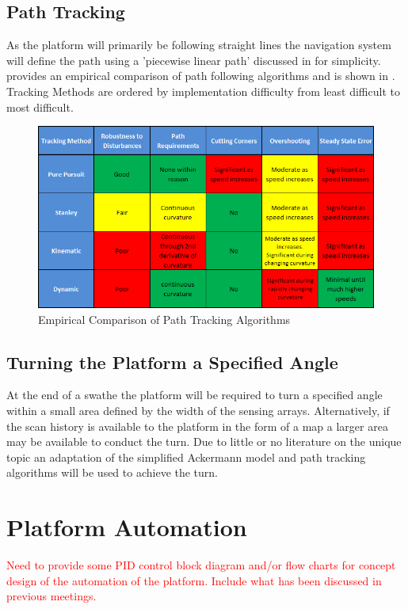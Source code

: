 \documentclass[main.tex]{subfiles}
\begin{document}
\subsection{Path Tracking}
As the platform will primarily be following straight lines the navigation system will define the path using a 'piecewise linear path' discussed in  for simplicity.
\Textcite{snider2009} provides an empirical comparison of path following algorithms and is shown in . Tracking Methods are ordered by implementation difficulty from least difficult to most difficult.
\begin{figure}[ht]
\includegraphics[width = \textwidth]{4-ConceptDesign/pathTrackingSummary2.png}
\centering
\caption[Empirical Comparison of Path Tracking Algorithms]{Empirical Comparison of Path Tracking Algorithms \parencite{snider2009}} 
\end{figure}

\subsection{Turning the Platform a Specified Angle}
At the end of a swathe the platform will be required to turn a specified angle within a small area defined by the width of the sensing arrays. Alternatively, if the scan history is available to the platform in the form of a map a larger area may be available to conduct the turn. Due to little or no literature on the unique topic an adaptation of the simplified Ackermann model and path tracking algorithms will be used to achieve the turn.

\section{Platform Automation}
\textcolor{red}{Need to provide some PID control block diagram and/or flow charts for concept design of the automation of the platform. Include what has been discussed in previous meetings.}
\end{document}

